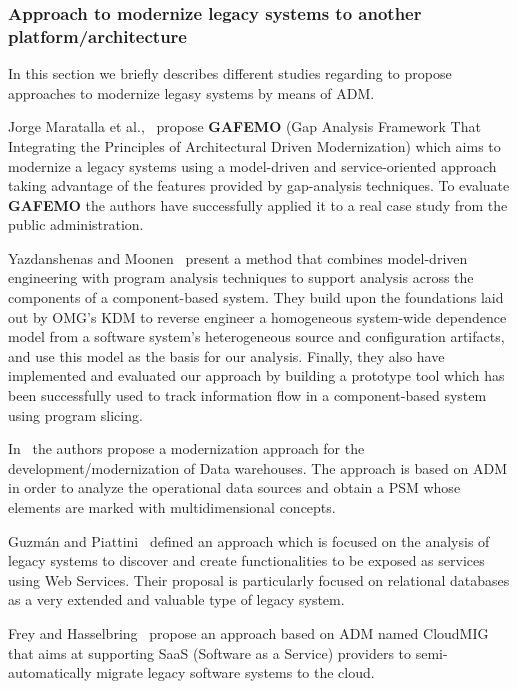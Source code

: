 \subsubsection{Approach to modernize legacy systems to another platform/architecture} %
\label{ssub:approach}


In this section we briefly describes different studies regarding to propose approaches to modernize legasy systems by means of ADM.  

Jorge Maratalla et al.,~\cite{6311013} propose \textbf{GAFEMO} (Gap Analysis Framework That Integrating the Principles of Architectural Driven Modernization) which aims to modernize a legacy systems using a model-driven and service-oriented approach taking advantage of the features provided by gap-analysis techniques. To evaluate \textbf{GAFEMO} the authors have successfully applied it to a real case study from the public administration. 

Yazdanshenas and Moonen~\cite{6080786} present a method that combines model-driven engineering with program analysis techniques to support analysis across the components of a component-based system. They build upon the foundations laid out by OMG's KDM to reverse engineer a homogeneous system-wide dependence model from a software system's heterogeneous source and configuration artifacts, and use this model as the basis for our analysis. Finally, they also have implemented and evaluated our approach by building a prototype tool which has been successfully used to track information flow in a component-based system using program slicing. 

In~\cite{Mazon:2007:MDM:1784489.1784497} the authors propose a modernization approach for the development/modernization of Data warehouses. The approach is based on ADM in order to analyze the operational data sources and obtain a PSM whose elements are marked with multidimensional concepts.

Guzm\'{a}n and Piattini~\cite{Guzman:2007:AAR:1339262.1339532} defined an approach which is focused on the analysis of legacy systems to discover and create functionalities to be exposed as services using Web Services. Their proposal is particularly focused on relational databases as a very extended and valuable type of legacy system.

Frey and Hasselbring~\cite{5741334, SMR:SMR582} propose an approach based on ADM named CloudMIG that aims at supporting SaaS (Software as a Service) providers to semi-automatically migrate legacy software systems to the cloud.

